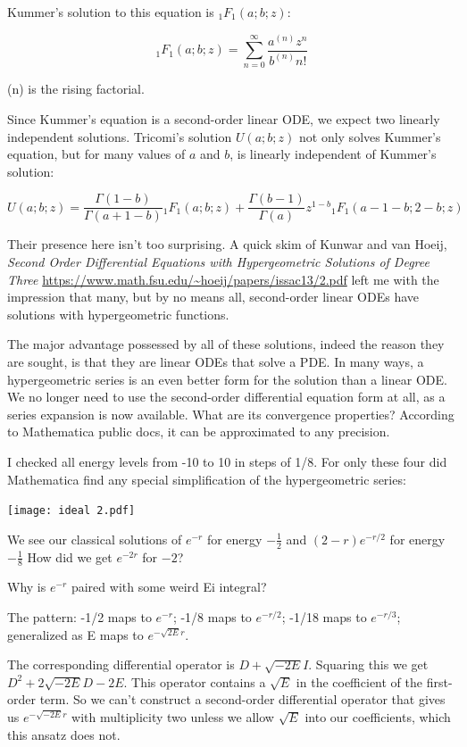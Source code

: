 \documentclass{article}
\begin{document}
Kummer's solution to this equation is ${}_1F_1(a;b;z)$:

\begin{equation}
{}_1F_1(a;b;z) = \sum_{n=0}^\infty \frac{a^{(n)}z^n}{b^{(n)}n!}
\end{equation}

(n) is the rising factorial.

Since Kummer's equation is a second-order linear ODE, we expect two linearly independent
solutions.  Tricomi's solution $U(a;b;z)$ not only solves Kummer's equation, but
for many values of $a$ and $b$, is linearly independent of Kummer's solution:

\begin{equation}
U(a;b;z) = \frac{\Gamma(1-b)}{\Gamma(a+1-b)} {}_1F_1(a;b;z) + \frac{\Gamma(b-1)}{\Gamma(a)} z^{1-b} {}_1F_1(a-1-b;2-b;z)
\end{equation}

Their presence here isn't too surprising.  A quick skim of Kunwar and van Hoeij,
{\it Second Order Differential Equations with Hypergeometric Solutions of Degree Three}
\url{https://www.math.fsu.edu/~hoeij/papers/issac13/2.pdf}
left me with the impression that many, but by no means all, second-order linear ODEs have
solutions with hypergeometric functions.

The major advantage possessed by all of these solutions, indeed the reason they are sought,
is that they are linear ODEs that solve a PDE.  In many ways, a hypergeometric series
is an even better form for the solution than a linear ODE.
We no longer need to use the second-order differential equation
form at all, as a series expansion is now available.  What are its convergence properties?
According to Mathematica public docs, it can be approximated to any precision.

I checked all energy levels from -10 to 10 in steps of 1/8.  For only these four did
Mathematica find any special simplification of the hypergeometric series:

\texttt{[image: ideal 2.pdf]}

We see our classical solutions of $e^{-r}$ for energy $-\frac{1}{2}$ and $(2-r)e^{-r/2}$
for energy $-\frac{1}{8}$  How did we get $e^{-2r}$ for $-2$?

Why is $e^{-r}$ paired with some weird Ei integral?

The pattern: -1/2 maps to $e^{-r}$; -1/8 maps to $e^{-r/2}$; -1/18 maps to $e^{-r/3}$;
generalized as E maps to $e^{-\sqrt{2E}r}$.

The corresponding differential operator is $D+\sqrt{-2E}I$.  Squaring this we get $D^2 + 2\sqrt{-2E}D - 2E$.
This operator contains a $\sqrt{E}$ in the coefficient of the first-order term.  So we can't construct
a second-order differential operator that gives us $e^{-\sqrt{-2E}r}$ with multiplicity two unless we
allow $\sqrt{E}$ into our coefficients, which this ansatz does not.
\end{document}
